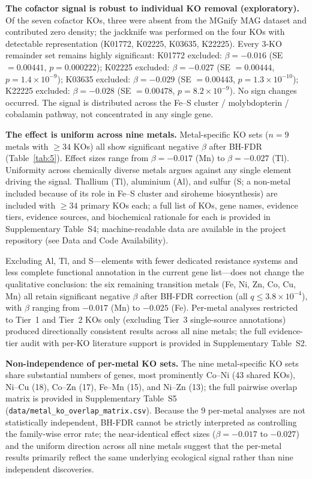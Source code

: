 \documentclass[times]{zHenriquesLab-StyleBioRxiv}
\begin{document}
\textbf{The cofactor signal is robust to individual KO removal (exploratory).} Of the seven cofactor KOs, three were absent from the MGnify
MAG dataset and contributed zero density; the jackknife was performed on the
four KOs with detectable representation (K01772, K02225, K03635, K22225). Every
3-KO remainder set remains highly significant: K01772 excluded: $\beta = -0.016$
(SE $= 0.00441$, $p = 0.000222$); K02225 excluded: $\beta = -0.027$
(SE $= 0.00444$, $p = 1.4 \times 10^{-9}$); K03635 excluded: $\beta = -0.029$
(SE $= 0.00443$, $p = 1.3 \times 10^{-10}$); K22225 excluded: $\beta = -0.028$
(SE $= 0.00478$, $p = 8.2 \times 10^{-9}$). No sign changes occurred. The
signal is distributed across the Fe--S cluster / molybdopterin / cobalamin
pathway, not concentrated in any single gene.

\textbf{The effect is uniform across nine metals.} Metal-specific KO sets ($n
= 9$ metals with $\geq 34$ KOs) all show significant negative $\beta$ after
BH-FDR (Table~\ref{tab:5}). Effect sizes range from $\beta = -0.017$ (Mn) to
$\beta = -0.027$ (Tl). Uniformity across chemically diverse metals argues
against any single element driving the signal. Thallium (Tl), aluminium (Al),
and sulfur (S; a non-metal included because of its role in Fe--S cluster and siroheme biosynthesis) are included with $\geq 34$ primary KOs each; a full
list of KOs, gene names, evidence tiers, evidence sources, and biochemical
rationale for each is provided in Supplementary Table~S4; machine-readable
data are available in the project repository (see Data and Code Availability).

Excluding Al, Tl, and S---elements with fewer dedicated resistance systems and
less complete functional annotation in the current gene list---does not change
the qualitative conclusion: the six remaining transition metals (Fe, Ni, Zn, Co,
Cu, Mn) all retain significant negative $\beta$ after BH-FDR correction (all
$q \leq 3.8 \times 10^{-4}$), with $\beta$ ranging from $-0.017$ (Mn) to
$-0.025$ (Fe). Per-metal analyses restricted to Tier~1 and Tier~2 KOs only
(excluding Tier~3 single-source annotations) produced directionally consistent
results across all nine metals; the full evidence-tier audit with per-KO literature
support is provided in Supplementary Table~S2.

\textbf{Non-independence of per-metal KO sets.} The nine metal-specific KO sets
share substantial numbers of genes, most prominently Co--Ni (43 shared KOs),
Ni--Cu (18), Co--Zn (17), Fe--Mn (15), and Ni--Zn (13); the full pairwise
overlap matrix is provided in Supplementary Table~S5
(\texttt{data/metal\_ko\_overlap\_matrix.csv}). Because the 9 per-metal analyses
are not statistically independent, BH-FDR cannot be strictly interpreted as
controlling the family-wise error rate; the near-identical effect sizes
($\beta = -0.017$ to $-0.027$) and the uniform direction across all nine metals
suggest that the per-metal results primarily reflect the same underlying
ecological signal rather than nine independent discoveries.
\end{document}
